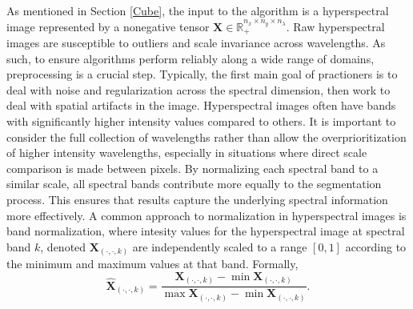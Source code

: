 As mentioned in Section \ref{Cube}, the input to the algorithm is a hyperspectral image represented by a nonegative tensor $\mathbf{X} \in \mathbb{R}_+^{n_x \times n_y \times n_\lambda}$. Raw hyperspectral images are susceptible to outliers and scale invariance across wavelengths. As such, to ensure algorithms perform reliably along a wide range of domains, preprocessing is a crucial step. Typically, the first main goal of practioners is to deal with noise and regularization across the spectral dimension, then work to deal with spatial artifacts in the image. 
Hyperspectral images often have bands with significantly higher intensity values compared to others. It is important to consider the full collection of wavelengths rather than allow the overprioritization of higher intensity wavelengths, especially in situations where direct scale comparison is made between pixels. By normalizing each spectral band to a similar scale, all spectral bands contribute more equally to the segmentation process. This ensures that results capture the underlying spectral information more effectively. A common approach to normalization in hyperspectral images is band normalization, where intesity values for the hyperspectral image at spectral band $k$, denoted $\mathbf{X}_{(\cdot, \cdot, k)}$ are independently scaled to a range $[0,1]$ according to the minimum and maximum values at that band. Formally,
\begin{equation}
    \label{alg:normalization}
    \hat{\mathbf{X}}_{(\cdot, \cdot, k)} =  \frac{\mathbf{X}_{(\cdot, \cdot, k)} - \min\mathbf{X}_{(\cdot, \cdot, k)}}{\max\mathbf{X}_{(\cdot, \cdot, k)} - \min\mathbf{X}_{(\cdot, \cdot, k)}}.
\end{equation}


